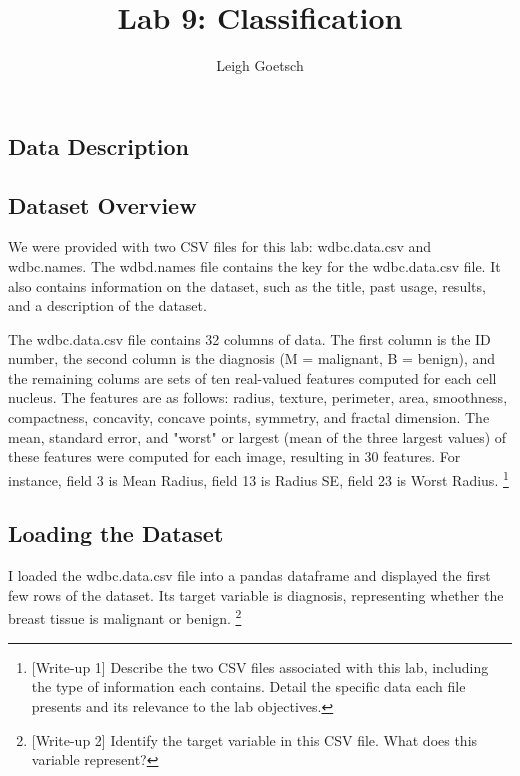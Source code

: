 \documentclass{labReport}
\title{Lab 9: Classification}
\author{Leigh Goetsch}
\begin{document}
\maketitle


\newpage
\begin{multicols*}{2}
    \raggedcolumns

    \section{Data Description}

    \subsection{Dataset Overview}
    We were provided with two CSV files for this lab: wdbc.data.csv and wdbc.names. The wdbd.names file contains the key for the wdbc.data.csv file. It also contains information on the dataset, such as the title, past usage, results, and a description of the dataset.

    The wdbc.data.csv file contains 32 columns of data. The first column is the ID number, the second column is the diagnosis (M = malignant, B = benign), and the remaining colums are sets of ten real-valued features computed for each cell nucleus. The features are as follows: radius, texture, perimeter, area, smoothness, compactness, concavity, concave points, symmetry, and fractal dimension. The mean, standard error, and "worst" or largest (mean of the three largest values) of these features were computed for each image, resulting in 30 features. For instance, field 3 is Mean Radius, field 13 is Radius SE, field 23 is Worst Radius. \footnote{[Write-up 1] Describe the two CSV files associated with this lab, including the type of information each contains. Detail the specific data each file presents and its relevance to the lab objectives.}

    \subsection{Loading the Dataset}
    I loaded the wdbc.data.csv file into a pandas dataframe and displayed the first few rows of the dataset. Its target variable is diagnosis, representing whether the breast tissue is malignant or benign. \footnote{[Write-up 2] Identify the target variable in this CSV file. What does this variable represent?}


\end{multicols*}
\end{document}
